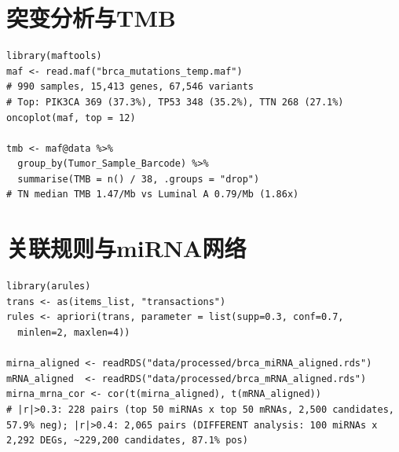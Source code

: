 \documentclass[12pt,a4paper,openany]{ctexbook}
\begin{document}
\section{突变分析与TMB}
\begin{lstlisting}[caption={maftools突变分析与TMB}, basicstyle=\ttfamily\scriptsize]
library(maftools)
maf <- read.maf("brca_mutations_temp.maf")
# 990 samples, 15,413 genes, 67,546 variants
# Top: PIK3CA 369 (37.3%), TP53 348 (35.2%), TTN 268 (27.1%)
oncoplot(maf, top = 12)

tmb <- maf@data %>%
  group_by(Tumor_Sample_Barcode) %>%
  summarise(TMB = n() / 38, .groups = "drop")
# TN median TMB 1.47/Mb vs Luminal A 0.79/Mb (1.86x)
\end{lstlisting}

\section{关联规则与miRNA网络}
\begin{lstlisting}[caption={Apriori关联规则与miRNA-mRNA相关}, basicstyle=\ttfamily\scriptsize]
library(arules)
trans <- as(items_list, "transactions")
rules <- apriori(trans, parameter = list(supp=0.3, conf=0.7,
  minlen=2, maxlen=4))

mirna_aligned <- readRDS("data/processed/brca_miRNA_aligned.rds")
mRNA_aligned  <- readRDS("data/processed/brca_mRNA_aligned.rds")
mirna_mrna_cor <- cor(t(mirna_aligned), t(mRNA_aligned))
# |r|>0.3: 228 pairs (top 50 miRNAs x top 50 mRNAs, 2,500 candidates, 57.9% neg); |r|>0.4: 2,065 pairs (DIFFERENT analysis: 100 miRNAs x 2,292 DEGs, ~229,200 candidates, 87.1% pos)
\end{lstlisting}
\end{document}

